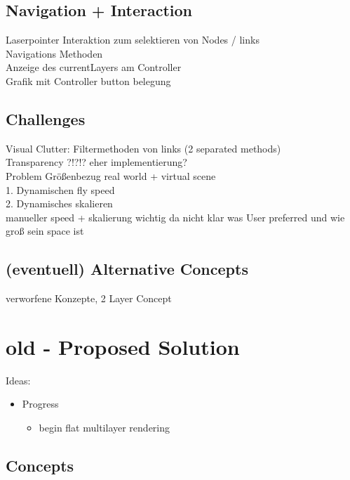 \section{Navigation + Interaction}

Laserpointer Interaktion zum selektieren von Nodes / links\\
Navigations Methoden\\
Anzeige des currentLayers am Controller\\
Grafik mit Controller button belegung\\

\section{Challenges}

Visual Clutter: Filtermethoden von links (2 separated methods)\\
Transparency ?!?!? eher implementierung?\\
Problem Größenbezug real world + virtual scene\\
1. Dynamischen fly speed\\
2. Dynamisches skalieren\\
manueller speed + skalierung wichtig da nicht klar was User preferred und wie groß sein space ist\\ 


\section{(eventuell) Alternative Concepts}

verworfene Konzepte, 2 Layer Concept\\

\chapter{old - Proposed Solution}
Ideas:
\begin{itemize}
    \item Progress
        \begin{itemize}
            \item begin flat multilayer rendering
        \end{itemize}
\end{itemize}

\section{Concepts}
